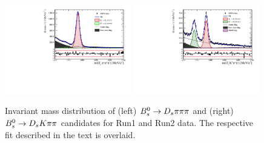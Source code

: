 \begin{figure}[h]
\includegraphics[height=7.cm,width=0.49\textwidth]{figs/MassFit/norm_pull.pdf}
\includegraphics[height=7.cm,width=0.49\textwidth]{figs/MassFit/signal_pull.pdf}
\caption{Invariant mass distribution of (left) ${{B}^0_{s}}\rightarrow{\ensuremath{{D}_{s}}}{\ensuremath{\pi}}{\ensuremath{\pi}}{\ensuremath{\pi}}$ and (right) ${{B}^0_{s}}\rightarrow{\ensuremath{{D}_{s}}}{\ensuremath{K}}{\ensuremath{\pi}}{\ensuremath{\pi}}$ candidates for Run1 and Run2 data.
The respective fit described in the text is overlaid.}
\label{fig: BsDsKpipiFit}
\end{figure}


